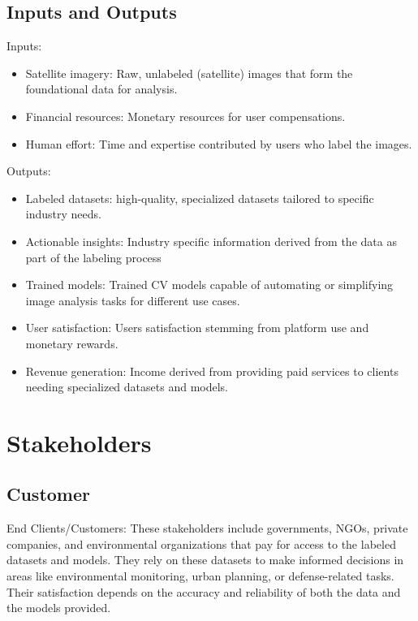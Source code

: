 \documentclass{article}
\begin{document}
\newpage{}
\subsection{Inputs and Outputs}

Inputs:

\begin{itemize}
    \item Satellite imagery: Raw, unlabeled (satellite) images that form the foundational data for analysis.
    \item Financial resources: Monetary resources for user compensations.
    \item Human effort: Time and expertise contributed by users who label the images.
\end{itemize}

Outputs:

\begin{itemize}
    \item Labeled datasets: high-quality, specialized datasets tailored to specific industry needs.
    \item Actionable insights: Industry specific information derived from the data as part of the labeling process
    \item Trained models: Trained CV models capable of automating or simplifying image analysis tasks for different use cases.
    \item User satisfaction: Users satisfaction stemming from platform use and monetary rewards.
    \item Revenue generation: Income derived from providing paid services to clients needing specialized datasets and models.
\end{itemize}

\section{Stakeholders}


\subsection{Customer}
End Clients/Customers: These stakeholders include governments, NGOs, private companies, and environmental organizations that pay for access to the labeled datasets and models. They rely on these datasets to make informed decisions in areas like environmental monitoring, urban planning, or defense-related tasks. Their satisfaction depends on the accuracy and reliability of both the data and the models provided.
\end{document}
